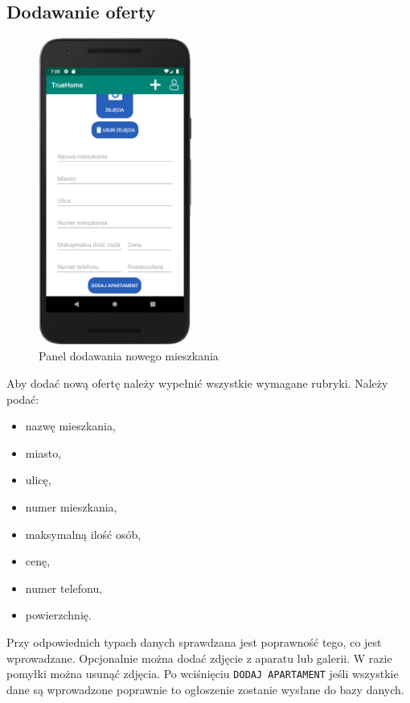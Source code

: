 \documentclass[polish, 11pt]{article}
\begin{document}
       \subsection{Dodawanie oferty}
        \begin{figure}[H]
                    \centering
                    \includegraphics[width=0.45\textwidth]{aplikacja/add.png}
                    \caption{Panel dodawania nowego mieszkania}
        \end{figure}
        Aby dodać nową ofertę należy wypełnić wszystkie wymagane rubryki. Należy podać:
        \begin{itemize}
            \item nazwę mieszkania,
            \item miasto,
            \item ulicę,
            \item numer mieszkania,
            \item maksymalną ilość osób,
            \item cenę,
            \item numer telefonu,
            \item powierzchnię.
        \end{itemize}
        Przy odpowiednich typach danych sprawdzana jest poprawność tego, co jest wprowadzane. Opcjonalnie można dodać zdjęcie z aparatu lub galerii. W razie pomyłki można usunąć zdjęcia. Po wciśnięciu \texttt{DODAJ APARTAMENT} jeśli wszystkie dane są wprowadzone poprawnie to ogłoszenie zostanie wysłane do bazy danych.
\end{document}
